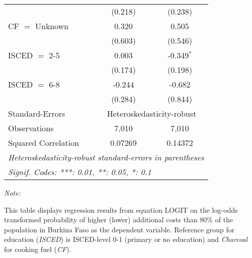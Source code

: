 \begin{table}[htbp!]
\begin{adjustbox}{width = 1\textwidth, max height = 0.95\textheight, center}
\begin{threeparttable}[b]
\begin{tabular}{lcc}
                                 & (0.218)       & (0.238)\\   
            CF $=$ Unknown       & 0.320         & 0.505\\   
                                 & (0.603)       & (0.546)\\   
            ISCED $=$ 2-5        & 0.003         & -0.349$^{*}$\\   
                                 & (0.174)       & (0.198)\\   
            ISCED $=$ 6-8        & -0.244        & -0.682\\   
                                 & (0.284)       & (0.844)\\   
            \midrule 
            Standard-Errors & \multicolumn{2}{c}{Heteroskedasticity-robust} \\ 
            Observations         & 7,010         & 7,010\\  
            Squared Correlation  & 0.07269       & 0.14372\\  
            \midrule \midrule
            \multicolumn{3}{l}{\emph{Heteroskedasticity-robust standard-errors in parentheses}}\\
            \multicolumn{3}{l}{\emph{Signif. Codes: ***: 0.01, **: 0.05, *: 0.1}}\\
         \end{tabular}
         
         \begin{tablenotes}\item \medskip \textit{Note:}
            \item This table displays regression results from equation LOGIT on the log-odds transformed probability of higher (lower) additional costs than 80\% of the population in Burkina Faso as the dependent variable. Reference group for education (\textit{ISCED}) is ISCED-level 0-1 (primary or no education) and \textit{Charcoal} for cooking fuel (\textit{CF}).
         \end{tablenotes}
      \end{threeparttable}
   \end{adjustbox}
\end{table}


